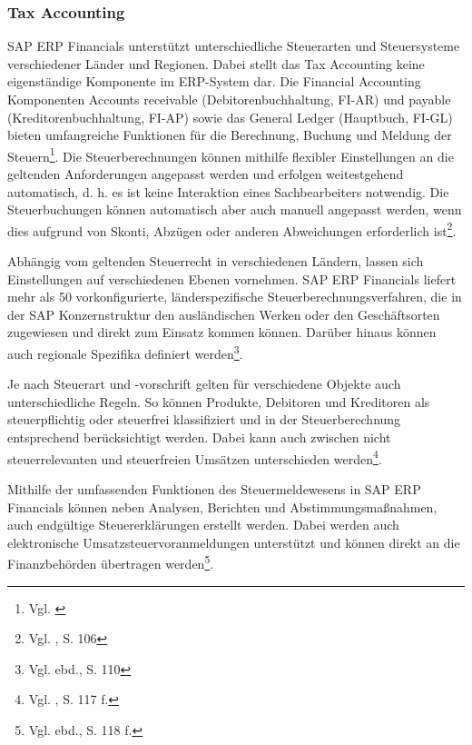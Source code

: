 \subsubsection{Tax Accounting} %
SAP ERP Financials unterstützt unterschiedliche Steuerarten und Steuersysteme verschiedener Länder und Regionen. Dabei stellt das Tax Accounting keine eigenständige Komponente im ERP-System dar. Die Financial Accounting Komponenten Accounts receivable (Debitorenbuchhaltung, FI-AR) und payable (Kreditorenbuchhaltung, FI-AP) sowie das General Ledger (Hauptbuch, FI-GL) bieten umfangreiche Funktionen für die Berechnung, Buchung und Meldung der Steuern\footnote{Vgl. \cite{SAPFIAPAR2006}}. Die Steuerberechnungen können mithilfe flexibler Einstellungen an die geltenden Anforderungen angepasst werden und erfolgen weitestgehend automatisch, d. h. es ist keine Interaktion eines Sachbearbeiters notwendig. Die Steuerbuchungen können automatisch aber auch manuell angepasst werden, wenn dies aufgrund von Skonti, Abzügen oder anderen Abweichungen erforderlich ist\footnote{Vgl. \cite{Patel2009}, S. 106}.

Abhängig vom geltenden Steuerrecht in verschiedenen Ländern, lassen sich Einstellungen auf verschiedenen Ebenen vornehmen. SAP ERP Financials liefert mehr als 50 vorkonfigurierte, länderspezifische Steuerberechnungsverfahren, die in der SAP Konzernstruktur den ausländischen Werken oder den Geschäftsorten zugewiesen und direkt zum Einsatz kommen können. Darüber hinaus können auch regionale Spezifika definiert werden\footnote{Vgl. ebd., S. 110}.

Je nach Steuerart und -vorschrift gelten für verschiedene Objekte auch unterschiedliche Regeln. So können Produkte, Debitoren und Kreditoren als steuerpflichtig oder steuerfrei klassifiziert und in der Steuerberechnung entsprechend berücksichtigt werden. Dabei kann auch zwischen nicht steuerrelevanten und steuerfreien Umsätzen unterschieden werden\footnote{Vgl. \cite{Patel2009}, S. 117 f.}.

Mithilfe der umfassenden Funktionen des Steuermeldewesens in SAP ERP Financials können neben Analysen, Berichten und Abstimmungsmaßnahmen, auch endgültige Steuererklärungen erstellt werden. Dabei werden auch elektronische Umsatzsteuervoranmeldungen unterstützt und können direkt an die Finanzbehörden übertragen werden\footnote{Vgl. ebd., S. 118 f.}.


